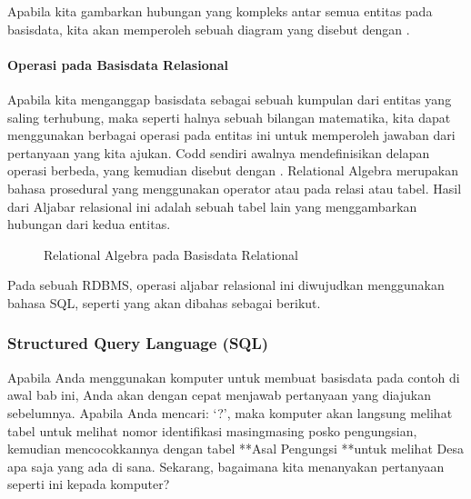 \documentclass[letterpaper,10pt,english]{sphinxmanual}
\let\sphinxpxdimen\pdfpxdimen\else\newdimen\sphinxpxdimen
\begin{document}
Apabila kita gambarkan hubungan yang kompleks antar semua entitas pada basisdata, kita akan memperoleh sebuah diagram yang disebut dengan .


\paragraph{Operasi pada Basisdata Relasional}
\label{\detokenize{sesi2/relationaldb:operasi-pada-basisdata-relasional}}
Apabila kita menganggap basisdata sebagai sebuah kumpulan dari entitas yang saling terhubung, maka seperti halnya sebuah bilangan matematika, kita dapat menggunakan berbagai operasi pada entitas ini untuk memperoleh jawaban dari pertanyaan yang kita ajukan. Codd sendiri awalnya mendefinisikan delapan operasi berbeda, yang kemudian disebut dengan . Relational Algebra merupakan bahasa prosedural yang menggunakan operator  atau  pada relasi atau tabel. Hasil dari Aljabar relasional ini adalah sebuah tabel lain yang menggambarkan hubungan dari kedua entitas.

\begin{figure}[htbp]
\centering
\capstart

\noindent\sphinxincludegraphics[height=300\sphinxpxdimen]{{2020-12-08-00-41-03}.png}
\caption{Relational Algebra pada Basisdata Relational}\label{\detokenize{sesi2/relationaldb:relag}}\end{figure}

Pada sebuah RDBMS, operasi aljabar relasional ini diwujudkan menggunakan bahasa SQL, seperti yang akan dibahas sebagai berikut.


\subsubsection{Structured Query Language (SQL)}
\label{\detokenize{sesi2/relationaldb:structured-query-language-sql}}
Apabila Anda menggunakan komputer untuk membuat basisdata pada contoh di awal bab ini, Anda akan dengan cepat menjawab pertanyaan yang diajukan sebelumnya. Apabila Anda mencari: ‘?’, maka komputer akan langsung melihat tabel  untuk melihat nomor identifikasi masing\sphinxhyphen{}masing posko pengungsian, kemudian mencocokkannya dengan tabel **Asal Pengungsi **untuk melihat Desa apa saja yang ada di sana. Sekarang, bagaimana kita menanyakan pertanyaan seperti ini kepada komputer?
\end{document}
